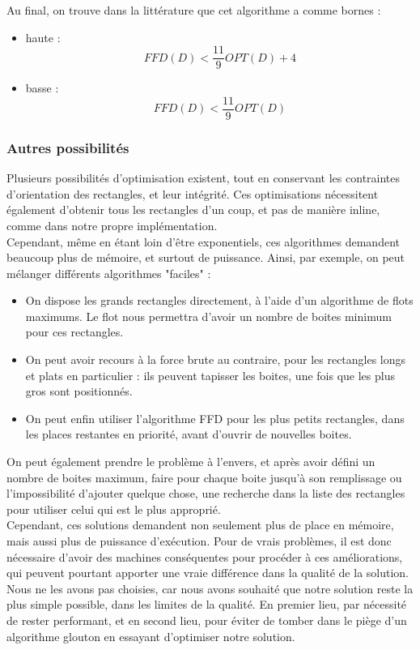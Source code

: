 \documentclass[12pt]{article}
\begin{document}
Au final, on trouve dans la littérature que cet algorithme a comme bornes : 
\begin{itemize}
\item haute : 
\[ FFD(D) < \frac{11}{9}OPT(D) + 4 \]
\item basse : 
\[ FFD(D) < \frac{11}{9}OPT(D) \]
\end{itemize}


\subsubsection*{Autres possibilités}
Plusieurs possibilités d'optimisation existent, tout en conservant les contraintes d'orientation des rectangles, et leur intégrité. Ces optimisations nécessitent également d'obtenir tous les rectangles d'un coup, et pas de manière inline, comme dans notre propre implémentation. \\
Cependant, même en étant loin d'être exponentiels, ces algorithmes demandent beaucoup plus de mémoire, et surtout de puissance. 
Ainsi, par exemple, on peut mélanger différents algorithmes "faciles" :\\
\begin{itemize}
\item On dispose les grands rectangles directement, à l'aide d'un algorithme de flots maximums. Le flot nous permettra d'avoir un nombre de boites minimum pour ces rectangles. 
\item On peut avoir recours à la force brute au contraire, pour les rectangles longs et plats en particulier : ils peuvent tapisser les boites, une fois que les plus gros sont positionnés. 
\item On peut enfin utiliser l'algorithme FFD pour les plus petits rectangles, dans les places restantes en priorité, avant d'ouvrir de nouvelles boites. 
\end{itemize}
On peut également prendre le problème à l'envers, et après avoir défini un nombre de boites maximum, faire pour chaque boite jusqu'à son remplissage ou l'impossibilité d'ajouter quelque chose, une recherche dans la liste des rectangles pour utiliser celui qui est le plus approprié. \\


Cependant, ces solutions demandent non seulement plus de place en mémoire, mais aussi plus de puissance d'exécution. Pour de vrais problèmes, il est donc nécessaire d'avoir des machines conséquentes pour procéder à ces améliorations, qui peuvent pourtant apporter une vraie différence dans la qualité de la solution. 
Nous ne les avons pas choisies, car nous avons souhaité que notre solution reste la plus simple possible, dans les limites de la qualité. En premier lieu, par nécessité de rester performant, et en second lieu, pour éviter de tomber dans le piège d'un algorithme glouton en  essayant d'optimiser notre solution.  
\end{document}
